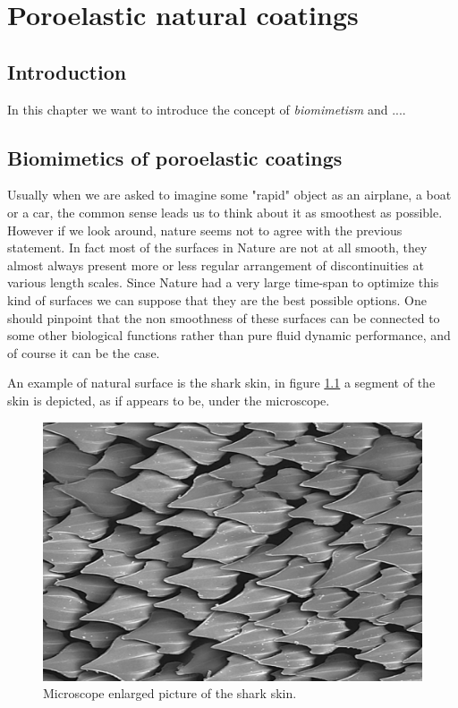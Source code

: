 \chapter{Poroelastic natural coatings}


\section{Introduction}
In this chapter we want to introduce the concept of \textit{biomimetism} and ....

\section{Biomimetics of poroelastic coatings}

Usually when we are asked to imagine some "rapid" object as an airplane, a boat or a car, the common sense leads us to think about it as smoothest as possible.
However if we look around, nature seems not to agree with the previous statement.
In fact most of the surfaces in Nature are not at all smooth, they almost always present more or less regular arrangement of discontinuities at various length scales.
Since Nature had a very large time-span to optimize this kind of surfaces we can suppose that they are the best possible options.
One should pinpoint that the non smoothness of these surfaces can be connected to some other biological functions rather than pure fluid dynamic performance, and of course it can be the case.

An example of natural surface is the shark skin, in figure \ref{fig:shark} a segment of the skin is depicted, as if appears to be, under the microscope.

\begin{figure}[h]
	\centering
	\includegraphics[width=0.6\linewidth]{chapter_1/shark}
	\caption{Microscope enlarged picture of the shark skin.}
	\label{fig:shark}
\end{figure}

